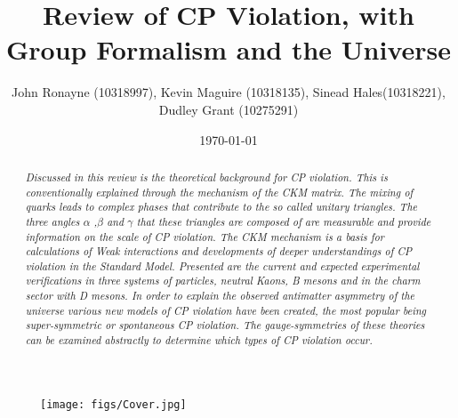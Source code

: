 \documentclass[floatfix,aps,prd,amsmath,amssymb]{revtex4}
\begin{document}
\title{Review of CP Violation, with Group Formalism and the Universe}
\author{John Ronayne (10318997), Kevin Maguire (10318135), Sinead Hales(10318221), Dudley Grant (10275291)}
\date{\today}

\begin{abstract}
\textit{Discussed in this review is the theoretical background for CP violation. This is conventionally explained through the mechanism of the CKM matrix. The mixing of quarks leads to complex phases that contribute to the so called unitary triangles. The three angles $\alpha$ ,$\beta$ and $\gamma$ that these triangles are composed of are measurable and provide information on the scale of CP violation. The CKM mechanism is a basis for calculations of Weak interactions and developments of deeper understandings of CP violation in the Standard Model. Presented are the current and expected experimental verifications in three systems of particles, neutral Kaons, B mesons and in the charm sector with D mesons. In order to explain the observed antimatter asymmetry of the universe various new models of CP violation have been created, the most popular being super-symmetric or spontaneous CP violation. The gauge-symmetries of these theories can be examined abstractly to determine which types of CP violation occur.}
\end{abstract}

\maketitle
{}

\begin{figure}[h!]
\begin{center}
\texttt{[image: figs/Cover.jpg]}
\end{center}
\end{figure}

\newpage

\tableofcontents
{}

\newpage
 















 
\end{document}
